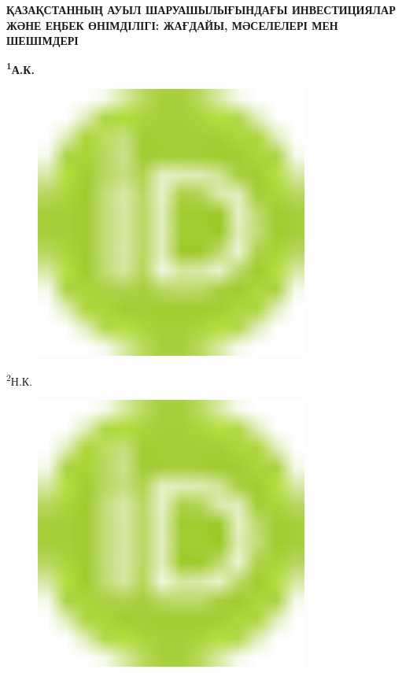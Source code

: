 
{\bfseries ҚАЗАҚСТАННЫҢ АУЫЛ ШАРУАШЫЛЫҒЫНДАҒЫ ИНВЕСТИЦИЯЛАР ЖӘНЕ ЕҢБЕК
ӨНІМДІЛІГІ: ЖАҒДАЙЫ, МӘСЕЛЕЛЕРІ МЕН ШЕШІМДЕРІ}

{\bfseries \textsuperscript{1}А.К.
\begin{figure}[H]
	\centering
	\includegraphics[width=0.8\textwidth]{media/ekon2/image1}
	\caption*{}
\end{figure}

\textsuperscript{2}Н.К.
\begin{figure}[H]
	\centering
	\includegraphics[width=0.8\textwidth]{media/ekon2/image1}
	\caption*{}
\end{figure}

}

